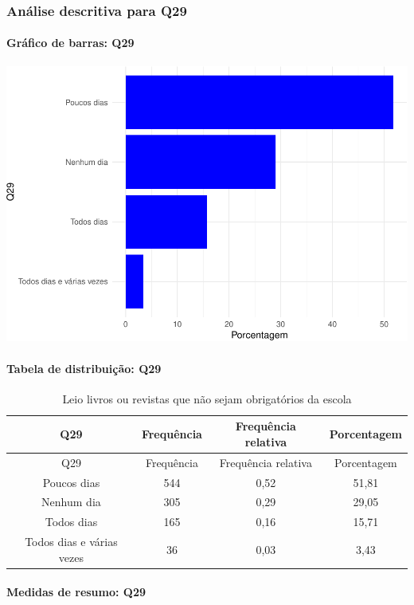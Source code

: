\documentclass[]{article}
\let\oldparagraph\paragraph
\renewcommand{\paragraph}[1]{\oldparagraph{#1}\mbox{}}
\begin{document}
\hypertarget{anuxe1lise-descritiva-para-q29}{%
\subsubsection{Análise descritiva para Q29}\label{anuxe1lise-descritiva-para-q29}}

\hypertarget{gruxe1fico-de-barras-q29}{%
\paragraph{Gráfico de barras: Q29}\label{gruxe1fico-de-barras-q29}}

\begin{center}\includegraphics[width=0.75\linewidth]{relatorio_covid19_files/figure-latex/unnamed-chunk-894-1} \end{center}

\hypertarget{tabela-de-distribuiuxe7uxe3o-q29}{%
\paragraph{Tabela de distribuição: Q29}\label{tabela-de-distribuiuxe7uxe3o-q29}}

\begin{longtable}[]{@{}cccc@{}}
\caption{\label{tab:unnamed-chunk-895}Leio livros ou revistas que não sejam obrigatórios da escola}\tabularnewline
\toprule
Q29 & Frequência & Frequência relativa & Porcentagem\tabularnewline
\midrule
\endfirsthead
\toprule
Q29 & Frequência & Frequência relativa & Porcentagem\tabularnewline
\midrule
\endhead
Poucos dias & 544 & 0,52 & 51,81\tabularnewline
Nenhum dia & 305 & 0,29 & 29,05\tabularnewline
Todos dias & 165 & 0,16 & 15,71\tabularnewline
Todos dias e várias vezes & 36 & 0,03 & 3,43\tabularnewline
\bottomrule
\end{longtable}

\hypertarget{medidas-de-resumo-q29}{%
\paragraph{Medidas de resumo: Q29}\label{medidas-de-resumo-q29}}
\end{document}
